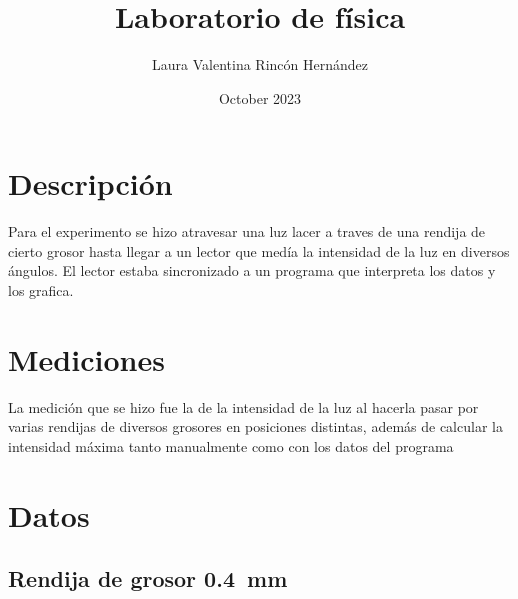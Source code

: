 \documentclass{article}
\title{Laboratorio de física}
\author{Laura Valentina Rincón Hernández}
\date{October 2023}
\begin{document}
\maketitle

\section{Descripción}

Para el experimento se hizo atravesar una luz lacer a traves de una rendija de cierto grosor hasta llegar a un lector que medía la intensidad de la luz en diversos ángulos. El lector estaba sincronizado a un programa que interpreta los datos y los grafica.  

\section{Mediciones}

    La medición que se hizo fue la de la intensidad de la luz al hacerla pasar por varias rendijas de diversos grosores en posiciones distintas, además de calcular la intensidad máxima tanto manualmente como con los datos del programa

\section{Datos}

    \subsection{Rendija de grosor \SI{0,4}{\milli\meter}}
    
        
    
\end{document}
